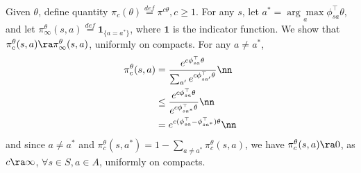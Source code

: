 \\
\indent
Given $\theta$, define quantity $\pi_c(\theta)\stackrel{def}{=}\pi^{c\theta}, c \geq 1$. For any $s$, let $a^*=\underset{a}{\arg\max} \phi^\top_{sa}\theta$, and let $\pi^\theta_\infty(s,a)\stackrel{def}{=}\mathbf{1}_{\{a=a^*\}}$, where $\mathbf{1}$ is the indicator function. We show that $\pi_c^\theta(s,a) \ra \pi^\theta_\infty(s,a)$, uniformly on compacts. For any $a\neq a^*$,
\begin{align}
\pi_c^\theta(s,a)&=\frac{e^{c\phi^\top_{sa}\theta}}{\sum_{a'}e^{c\phi^\top_{sa'} \theta}}\nn\\
 &\leq \frac{e^{c\phi^\top_{sa}\theta}}{e^{c\phi^\top_{sa^*} \theta}}\nn\\
&=e^{c(\phi^\top_{sa}-\phi^\top_{sa^*}) \theta}\nn
\end{align}
and since $a\neq a^*$ and $\pi^\theta_c(s,a^*)=1-\sum_{a\neq a^*} \pi^\theta_c(s,a)$, we have $\pi^\theta_c(s,a)\ra 0$, as $c \ra \infty$, $\forall s \in S, a \in A$, uniformly on compacts.

